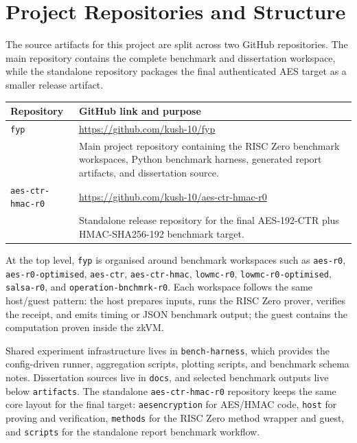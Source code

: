 \chapter*{Project Repositories and Structure}

The source artifacts for this project are split across two GitHub repositories.
The main repository contains the complete benchmark and dissertation workspace,
while the standalone repository packages the final authenticated AES target as a
smaller release artifact.

\begin{tabularx}{\textwidth}{@{}P{1.45in}L@{}}
\textbf{Repository} & \textbf{GitHub link and purpose} \\
\hline
\texttt{fyp} & \url{https://github.com/kush-10/fyp} \\
& Main project repository containing the RISC Zero benchmark workspaces, Python
benchmark harness, generated report artifacts, and dissertation source. \\
\texttt{aes-ctr-hmac-r0} & \url{https://github.com/kush-10/aes-ctr-hmac-r0} \\
& Standalone release repository for the final AES-192-CTR plus
HMAC-SHA256-192 benchmark target. \\
\end{tabularx}

At the top level, \texttt{fyp} is organised around benchmark workspaces such as
\texttt{aes-r0}, \texttt{aes-r0-optimised}, \texttt{aes-ctr},
\texttt{aes-ctr-hmac}, \texttt{lowmc-r0}, \texttt{lowmc-r0-optimised},
\texttt{salsa-r0}, and \texttt{operation-bnchmrk-r0}. Each workspace follows the
same host/guest pattern: the host prepares inputs, runs the RISC Zero prover,
verifies the receipt, and emits timing or JSON benchmark output; the guest
contains the computation proven inside the zkVM.

Shared experiment infrastructure lives in \texttt{bench-harness}, which provides
the config-driven runner, aggregation scripts, plotting scripts, and benchmark
schema notes. Dissertation sources live in \texttt{docs}, and selected benchmark
outputs live below \texttt{artifacts}. The standalone \texttt{aes-ctr-hmac-r0}
repository keeps the same core layout for the final target: \texttt{aesencryption}
for AES/HMAC code, \texttt{host} for proving and verification, \texttt{methods}
for the RISC Zero method wrapper and guest, and \texttt{scripts} for the
standalone report benchmark workflow.
